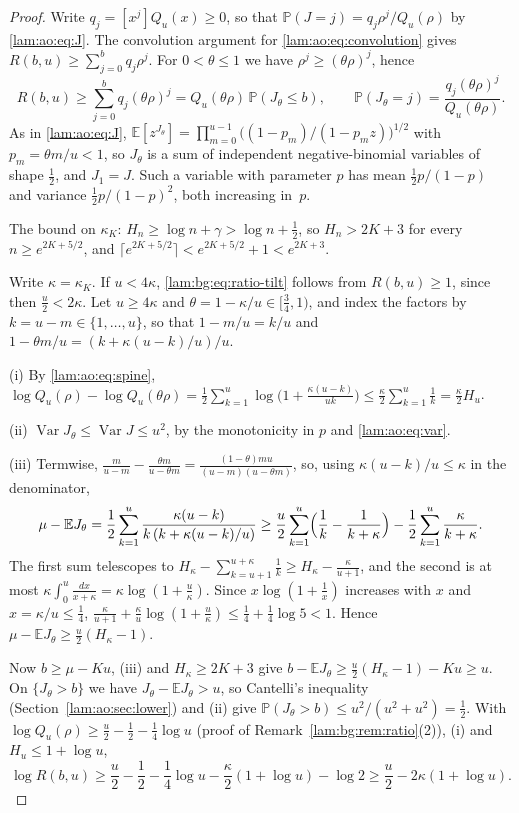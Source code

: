 \documentclass[11pt,a4paper]{article}
\numberwithin{equation}{section}
\theoremstyle{remark}
\newcommand{\Prob}{\mathbb P}
\newcommand{\E}{\mathbb E}
\DeclareMathOperator{\Var}{Var}
\begin{document}
\begin{proof}
Write $q_j=[x^j]Q_u(x)\ge0$, so that $\Prob(J=j)=q_j\rho^j/Q_u(\rho)$ by \eqref{lam:ao:eq:J}. The convolution argument for \eqref{lam:ao:eq:convolution} gives $R(b,u)\ge\sum_{j=0}^bq_j\rho^j$. For $0<\theta\le1$ we have $\rho^j\ge(\theta\rho)^j$, hence
\[
 R(b,u)\ge\sum_{j=0}^bq_j(\theta\rho)^j=Q_u(\theta\rho)\,\Prob(J_\theta\le b),\qquad
 \Prob(J_\theta=j)=\frac{q_j(\theta\rho)^j}{Q_u(\theta\rho)}.
\]
As in \eqref{lam:ao:eq:J}, $\E[z^{J_\theta}]=\prod_{m=0}^{u-1}\bigl((1-p_m)/(1-p_mz)\bigr)^{1/2}$ with $p_m=\theta m/u<1$, so $J_\theta$ is a sum of independent negative-binomial variables of shape $\frac12$, and $J_1=J$. Such a variable with parameter $p$ has mean $\frac12p/(1-p)$ and variance $\frac12p/(1-p)^2$, both increasing in~$p$.

The bound on $\kappa_K$: $H_n\ge\log n+\gamma>\log n+\frac12$, so $H_n>2K+3$ for every $n\ge e^{2K+5/2}$, and $\lceil e^{2K+5/2}\rceil<e^{2K+5/2}+1<e^{2K+3}$.

Write $\kappa=\kappa_K$. If $u<4\kappa$, \eqref{lam:bg:eq:ratio-tilt} follows from $R(b,u)\ge1$, since then $\frac u2<2\kappa$. Let $u\ge4\kappa$ and $\theta=1-\kappa/u\in[\frac34,1)$, and index the factors by $k=u-m\in\{1,\dots,u\}$, so that $1-m/u=k/u$ and $1-\theta m/u=(k+\kappa(u-k)/u)/u$.

(i) By \eqref{lam:ao:eq:spine}, $\log Q_u(\rho)-\log Q_u(\theta\rho)=\frac12\sum_{k=1}^u\log\bigl(1+\frac{\kappa(u-k)}{uk}\bigr)\le\frac\kappa2\sum_{k=1}^u\frac1k=\frac\kappa2H_u$.

(ii) $\Var J_\theta\le\Var J\le u^2$, by the monotonicity in $p$ and \eqref{lam:ao:eq:var}.

(iii) Termwise, $\frac m{u-m}-\frac{\theta m}{u-\theta m}=\frac{(1-\theta)mu}{(u-m)(u-\theta m)}$, so, using $\kappa(u-k)/u\le\kappa$ in the denominator,
\[
 \mu-\E J_\theta=\frac12\sum_{k=1}^u\frac{\kappa(u-k)}{k\,(k+\kappa(u-k)/u)}
 \ge\frac u2\sum_{k=1}^u\Bigl(\frac1k-\frac1{k+\kappa}\Bigr)-\frac12\sum_{k=1}^u\frac\kappa{k+\kappa}.
\]
The first sum telescopes to $H_\kappa-\sum_{k=u+1}^{u+\kappa}\frac1k\ge H_\kappa-\frac\kappa{u+1}$, and the second is at most $\kappa\int_0^u\frac{dx}{x+\kappa}=\kappa\log(1+\frac u\kappa)$. Since $x\log(1+\frac1x)$ increases with $x$ and $x=\kappa/u\le\frac14$, $\frac\kappa{u+1}+\frac\kappa u\log(1+\frac u\kappa)\le\frac14+\frac14\log5<1$. Hence $\mu-\E J_\theta\ge\frac u2(H_\kappa-1)$.

Now $b\ge\mu-Ku$, (iii) and $H_\kappa\ge2K+3$ give $b-\E J_\theta\ge\frac u2(H_\kappa-1)-Ku\ge u$. On $\{J_\theta>b\}$ we have $J_\theta-\E J_\theta>u$, so Cantelli's inequality (Section~\ref{lam:ao:sec:lower}) and (ii) give $\Prob(J_\theta>b)\le u^2/(u^2+u^2)=\frac12$. With $\log Q_u(\rho)\ge\frac u2-\frac12-\frac14\log u$ (proof of Remark~\ref{lam:bg:rem:ratio}(2)), (i) and $H_u\le1+\log u$,
\[
 \log R(b,u)\ge\frac u2-\frac12-\frac14\log u-\frac\kappa2(1+\log u)-\log2\ge\frac u2-2\kappa(1+\log u).
\]


\end{proof}
\end{document}
